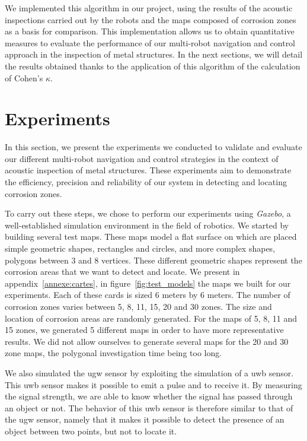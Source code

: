 We implemented this algorithm in our project, using the results of the acoustic inspections carried out by the robots and the maps composed of corrosion zones as a basis for comparison.
This implementation allows us to obtain quantitative measures to evaluate the performance of our multi-robot navigation and control approach in the inspection of metal structures.
In the next sections, we will detail the results obtained thanks to the application of this algorithm of the calculation of Cohen's $\kappa$.

\section{Experiments}

In this section, we present the experiments we conducted to validate and evaluate our different multi-robot navigation and control strategies in the context of acoustic inspection of metal structures.
These experiments aim to demonstrate the efficiency, precision and reliability of our system in detecting and locating corrosion zones.

To carry out these steps, we chose to perform our experiments using \textit{Gazebo}, a well-established simulation environment in the field of robotics.
We started by building several test maps.
These maps model a flat surface on which are placed simple geometric shapes, rectangles and circles, and more complex shapes, polygons between 3 and 8 vertices.
These different geometric shapes represent the corrosion areas that we want to detect and locate.
We present in appendix~\ref{annexe:cartes}, in figure~\ref{fig:test_models} the maps we built for our experiments.
Each of these cards is sized 6 meters by 6 meters.
The number of corrosion zones varies between 5, 8, 11, 15, 20 and 30 zones.
The size and location of corrosion areas are randomly generated.
For the maps of 5, 8, 11 and 15 zones, we generated 5 different maps in order to have more representative results.
We did not allow ourselves to generate several maps for the 20 and 30 zone maps, the polygonal investigation time being too long.

We also simulated the \gls{ugw} sensor by exploiting the simulation of a \gls{uwb} sensor.
This \gls{uwb} sensor makes it possible to emit a pulse and to receive it.
By measuring the signal strength, we are able to know whether the signal has passed through an object or not.
The behavior of this \gls{uwb} sensor is therefore similar to that of the \gls{ugw} sensor, namely that it makes it possible to detect the presence of an object between two points, but not to locate it.

